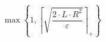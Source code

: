 \[\max\left\{ 1, \left\lceil \sqrt{\frac{2 \cdot L \cdot R^{2}}{\varepsilon}} \right\rceil_{+} \right\}\]
